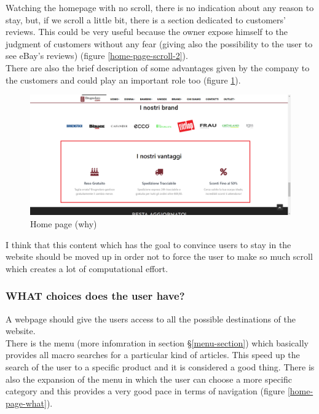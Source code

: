 Watching the homepage with no scroll, there is no indication about any reason to stay, but, if we scroll a little bit,
there is a section dedicated to customers' reviews. This could be very useful because the owner
expose himself to the judgment of customers without any fear (giving also the possibility to
the user to see eBay's reviews) (figure \ref{home-page-scroll-2}).\\
There are also the brief description of some advantages given by the company to the customers
and could play an important role too (figure \ref{home-page-why}).
\begin{figure}[!h] 
    \centering 
    \includegraphics[scale = 0.29]{images/why.png} 
    \caption{Home page (why)}
    \label{home-page-why}
\end{figure}
\newline
I think that this content which has the goal to convince users to stay in the website should be
moved up in order not to force the user to make so much scroll which creates a lot of computational effort.

\subsubsection{WHAT choices does the user have?}\label{what}
A webpage should give the users access to all the possible
destinations of the website.\\
There is the menu (more infomration in section §\ref{menu-section}) which basically provides all macro searches
for a particular kind of articles. This speed up the search of the user to a specific product and
it is considered a good thing. There is also the expansion of the menu in which the user can choose
a more specific category and this provides a very good pace in terms of navigation
(figure \ref{home-page-what}).\\

